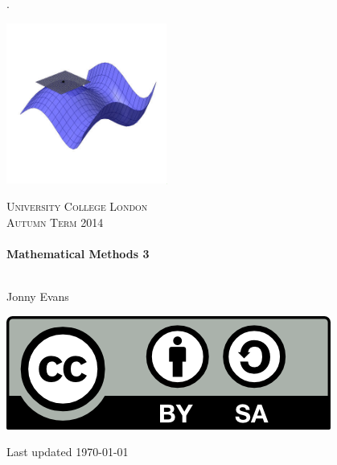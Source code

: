 \documentclass[12pt]{book}
\begin{document}

\begin{titlepage}



.


\begin{center}

\vspace{2cm}

\includegraphics[width=200px]{loc-max.jpg}

\vspace{1cm}

\textsc{\LARGE University College London}\\[1.5cm]

\textsc{\Large Autumn Term 2014}\\[0.5cm]


\HRule \\[0.4cm]
{ \huge \bfseries Mathematical Methods 3}\\[0.4cm]

\HRule \\[1.5cm]

\begin{minipage}{0.4\textwidth}
\begin{flushleft} \large
Jonny Evans
\end{flushleft}
\end{minipage}
\begin{minipage}{0.4\textwidth}
\begin{flushright} \large
\includegraphics{by-sa.png}
\end{flushright}
\end{minipage}

\vfill

{\large Last updated \today}

\end{center}

\end{titlepage}
\end{document}
